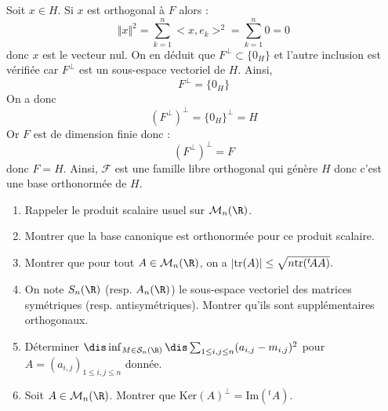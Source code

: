 \documentclass[a4paper,10pt]{report}
\begin{document}
\medskip

\noindent Soit $x \in H$. Si $x$ est orthogonal à $F$ alors :
$$ \Vert x \Vert^2= \sum_{k=1}^n <x,e_k>^2 = \sum_{k=1}^n  0 = 0$$
donc $x$ est le vecteur nul. On en déduit que $F^{\perp} \subset \lbrace 0_H \rbrace$ et l'autre inclusion est vérifiée car $F^{\perp}$ est un sous-espace vectoriel de $H$. Ainsi,
$$ F^{\perp} = \lbrace 0_H \rbrace$$
On a donc 
$$ (F^{\perp})^{\perp} = \lbrace 0_H \rbrace^{\perp} = H$$
Or $F$ est de dimension finie donc :
$$ (F^{\perp})^{\perp} = F$$
donc $F=H$. Ainsi, $\mathcal{F}$ est une famille libre orthogonal qui génère $H$ donc c'est une base orthonormée de $H$.


\begin{Exercice}{} \begin{enumerate}
	\item Rappeler le produit scalaire usuel sur ${\cal M}_n(\R)$.
	
\item Montrer que la base canonique est orthonormée pour ce produit scalaire.

\item Montrer que pour tout $A\in{\cal M}_n(\R)$, on a  $|$tr$(A)|\leq \sqrt{n\hbox{tr}(^t\!AA)}.$
	
\item On note $S_n(\R)$ (resp. $A_n(\R)$)	le sous-espace vectoriel des matrices sym\'etriques (resp. antisym\'etriques). Montrer qu'ils sont suppl\'ementaires orthogonaux.

\item Déterminer $\dis\inf_{M\in{\cal S}_n(\R)}\dis\sum_{1 \leq i,j \leq n}(a_{i,j}-m_{i,j})^2$ pour $A=(a_{i,j})_{1 \leq i,j \leq n}$ donn\'ee.
\item Soit $A\in{\cal M}_n(\R)$. Montrer que $\textrm{Ker}(A)^{\perp}= \textrm{Im}(^t\!A)$.
\end{enumerate}
\end{Exercice}

\corr 
\end{document}
